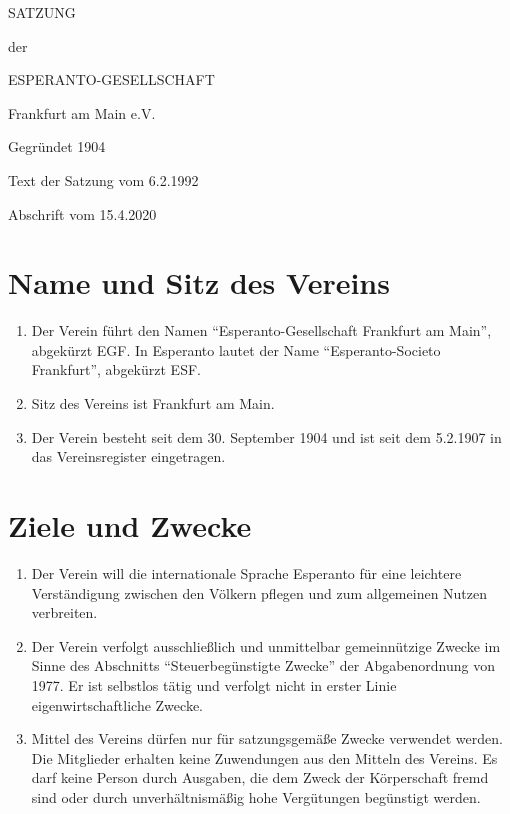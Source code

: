 \documentclass[11pt]{article}
\begin{document}
\begin{titlepage}
\vspace*{\fill}
\centering
\huge 
SATZUNG

der

ESPERANTO-GESELLSCHAFT

Frankfurt am Main e.V.

Gegründet 1904

\vspace{1cm}
\normalsize
Text der Satzung vom 6.2.1992

Abschrift vom 15.4.2020
\vspace*{\fill}
\end{titlepage}
\newpage

\section{Name und Sitz des Vereins}
\begin{enumerate}[label=\arabic*)]
	\item Der Verein führt den Namen "`Esperanto-Gesellschaft Frankfurt am Main"', abgekürzt EGF. In Esperanto lautet der Name "`Esperanto-Societo Frankfurt"', abgekürzt ESF.
	\item Sitz des Vereins ist Frankfurt am Main.
	\item Der Verein besteht seit dem 30. September 1904 und ist seit dem 5.2.1907 in das Vereinsregister eingetragen.
\end{enumerate}

\section{Ziele und Zwecke}
\begin{enumerate}[label=\arabic*)]
	\item Der Verein will die internationale Sprache Esperanto für eine leichtere Verständigung zwischen den Völkern pflegen und zum allgemeinen Nutzen verbreiten.
	\item Der Verein verfolgt ausschließlich und unmittelbar gemeinnützige Zwecke im Sinne des Abschnitts "`Steuerbegünstigte Zwecke"' der Abgabenordnung von 1977. Er ist selbstlos tätig und verfolgt nicht in erster Linie eigenwirtschaftliche Zwecke.
	\item Mittel des Vereins dürfen nur für satzungsgemäße Zwecke verwendet werden. Die Mitglieder erhalten keine Zuwendungen aus den Mitteln des Vereins. Es darf keine Person durch Ausgaben, die dem Zweck der Körperschaft fremd sind oder durch unverhältnismäßig hohe Vergütungen begünstigt werden.
\end{enumerate}
\end{document}
